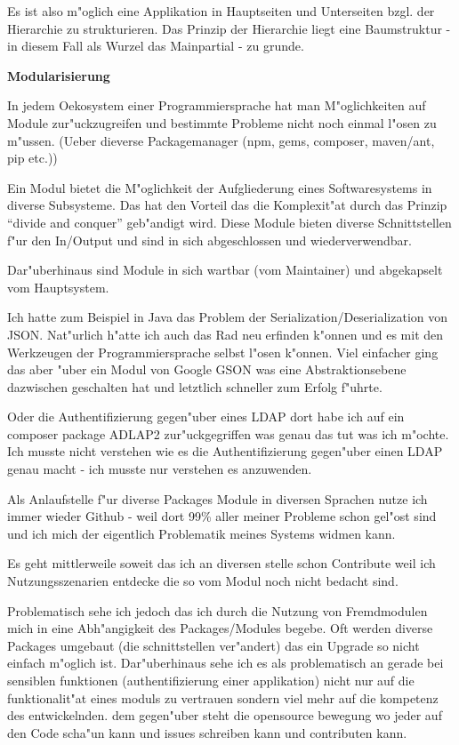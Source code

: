 Es ist also m"oglich eine Applikation in Hauptseiten und Unterseiten bzgl. der Hierarchie zu strukturieren.
Das Prinzip der Hierarchie liegt eine Baumstruktur - in diesem Fall als Wurzel das Mainpartial - zu grunde.

\newpage
\textbf{Modularisierung}

In jedem Oekosystem einer Programmiersprache hat man M"oglichkeiten auf Module zur"uckzugreifen und bestimmte Probleme nicht noch einmal l"osen zu m"ussen. (Ueber dieverse Packagemanager (npm, gems, composer, maven/ant, pip etc.))

Ein Modul bietet die M"oglichkeit der Aufgliederung eines Softwaresystems in diverse Subsysteme. Das hat den Vorteil das die Komplexit"at durch das Prinzip ``divide and conquer'' geb"andigt wird.
Diese Module bieten diverse Schnittstellen f"ur den In/Output und sind in sich abgeschlossen und wiederverwendbar.

Dar"uberhinaus sind Module in sich wartbar (vom Maintainer) und abgekapselt vom Hauptsystem.

Ich hatte zum Beispiel in Java das Problem der Serialization/Deserialization von JSON.
Nat"urlich h"atte ich auch das Rad neu erfinden k"onnen und es mit den Werkzeugen der Programmiersprache selbst l"osen k"onnen.
Viel einfacher ging das aber "uber ein Modul von Google GSON was eine Abstraktionsebene dazwischen geschalten hat und letztlich schneller zum Erfolg f"uhrte.

Oder die Authentifizierung gegen"uber eines LDAP dort habe ich auf ein composer package ADLAP2 zur"uckgegriffen was genau das tut was ich m"ochte. Ich musste nicht verstehen wie es die Authentifizierung gegen"uber einen LDAP genau macht - ich musste nur verstehen es anzuwenden.

Als Anlaufstelle f"ur diverse Packages Module in diversen Sprachen nutze ich immer wieder Github - weil dort 99\% aller meiner Probleme schon gel"ost sind und ich mich der eigentlich Problematik meines Systems widmen kann.

Es geht mittlerweile soweit das ich an diversen stelle schon Contribute weil ich Nutzungsszenarien entdecke die so vom Modul noch nicht bedacht sind.

Problematisch sehe ich jedoch das ich durch die Nutzung von Fremdmodulen mich in eine Abh"angigkeit des Packages/Modules begebe. Oft werden diverse Packages umgebaut (die schnittstellen ver"andert) das ein Upgrade so nicht einfach m"oglich ist.
Dar"uberhinaus sehe ich es als problematisch an gerade bei sensiblen funktionen (authentifizierung einer applikation) nicht nur auf die funktionalit"at eines moduls zu vertrauen sondern viel mehr auf die kompetenz des entwickelnden.
dem gegen"uber steht die opensource bewegung wo jeder auf den Code scha"un kann und issues schreiben kann und contributen kann.




